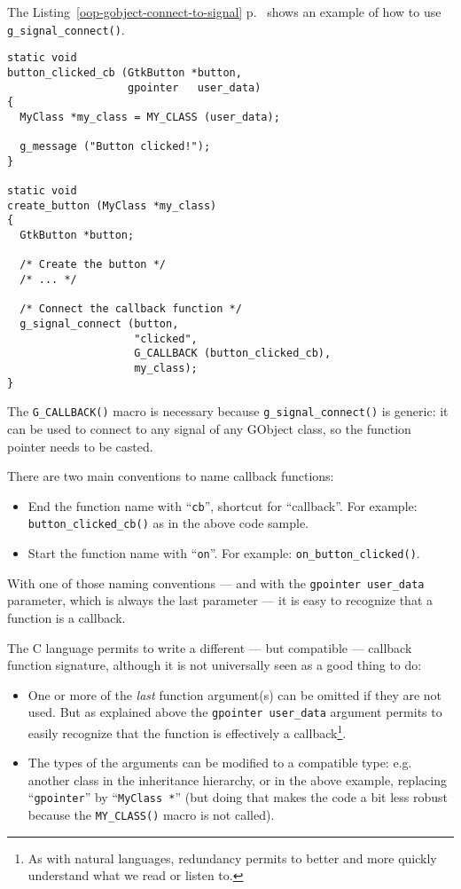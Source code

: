 The Listing~\ref{oop-gobject-connect-to-signal} p.~\pageref{oop-gobject-connect-to-signal} shows an example of how to use \lstinline{g_signal_connect()}.

\begin{lstlisting}[float, caption={How to connect to a signal}, label=oop-gobject-connect-to-signal]
static void
button_clicked_cb (GtkButton *button,
                   gpointer   user_data)
{
  MyClass *my_class = MY_CLASS (user_data);

  g_message ("Button clicked!");
}

static void
create_button (MyClass *my_class)
{
  GtkButton *button;

  /* Create the button */
  /* ... */

  /* Connect the callback function */
  g_signal_connect (button,
                    "clicked",
                    G_CALLBACK (button_clicked_cb),
                    my_class);
}
\end{lstlisting}

The \lstinline{G_CALLBACK()} macro is necessary because \lstinline{g_signal_connect()} is generic: it can be used to connect to any signal of any GObject class, so the function pointer needs to be casted.

There are two main conventions to name callback functions:
\begin{itemize}
  \item End the function name with ``\lstinline{cb}'', shortcut for ``callback''. For example: \lstinline{button_clicked_cb()} as in the above code sample.
  \item Start the function name with ``\lstinline{on}''. For example: \lstinline{on_button_clicked()}.
\end{itemize}

With one of those naming conventions --- and with the \lstinline{gpointer user_data} parameter, which is always the last parameter --- it is easy to recognize that a function is a callback.

The C language permits to write a different --- but compatible --- callback function signature, although it is not universally seen as a good thing to do:
\begin{itemize}
  \item One or more of the \emph{last} function argument(s) can be omitted if they are not used. But as explained above the \lstinline{gpointer user_data} argument permits to easily recognize that the function is effectively a callback\footnote{As with natural languages, redundancy permits to better and more quickly understand what we read or listen to.}.
  \item The types of the arguments can be modified to a compatible type: e.g. another class in the inheritance hierarchy, or in the above example, replacing ``\lstinline{gpointer}'' by ``\lstinline{MyClass *}'' (but doing that makes the code a bit less robust because the \lstinline{MY_CLASS()} macro is not called).
\end{itemize}

